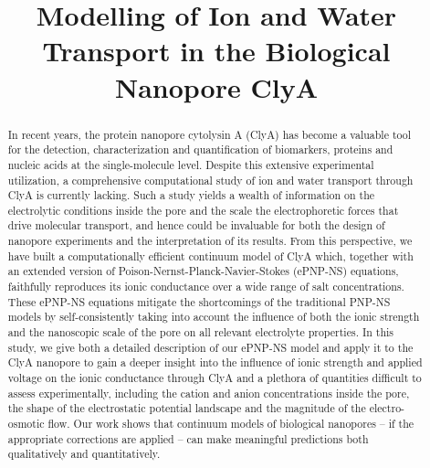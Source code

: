 \documentclass[journal=ancac3,manuscript=article,etalmode=truncate,maxauthors=0,layout=twocolumn]{achemso}
\title{Modelling of Ion and Water Transport in the Biological Nanopore ClyA}
\begin{document}
\begin{tocentry}
\end{tocentry}

\begin{abstract}
\footnotesize
In recent years, the protein nanopore cytolysin A (ClyA) has become a valuable tool for the detection,
characterization and quantification of biomarkers, proteins and nucleic acids at the single-molecule level.
Despite this extensive experimental utilization, a comprehensive computational study of ion and water
transport through ClyA is currently lacking. Such a study yields a wealth of information on the electrolytic
conditions inside the pore and the scale the electrophoretic forces that drive molecular transport, and hence
could be invaluable for both the design of nanopore experiments and the interpretation of its results.
%
From this perspective, we have built a computationally efficient continuum model of ClyA which, together with
an extended version of Poison-Nernst-Planck-Navier-Stokes (ePNP-NS) equations, faithfully reproduces its ionic
conductance over a wide range of salt concentrations. These ePNP-NS equations mitigate the shortcomings
of the traditional PNP-NS models by self-consistently taking into account the influence of both the ionic
strength and the nanoscopic scale of the pore on all relevant electrolyte properties.
%
In this study,  we give both a detailed description of our ePNP-NS model and apply it to the ClyA nanopore to
gain a deeper insight into the influence of ionic strength and applied voltage on the ionic conductance
through ClyA and a plethora of quantities difficult to assess experimentally, including the cation and anion
concentrations inside the pore, the shape of the electrostatic potential landscape and the magnitude of the electro-osmotic flow. Our work shows that continuum models of biological nanopores -- if the
appropriate corrections are applied -- can make meaningful predictions both qualitatively and quantitatively.
\end{abstract}
\end{document}
